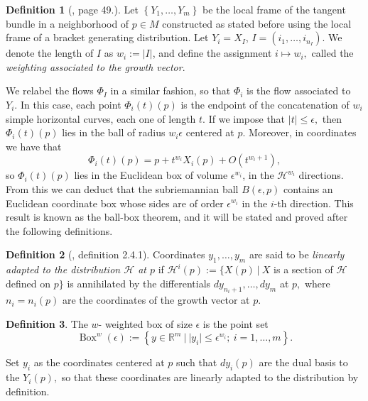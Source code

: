 \documentclass[12pt, letterpaper, reqno]{amsart}
\theoremstyle{definition}
\newtheorem{df}{Definition}
\theoremstyle{plain}
\theoremstyle{remark}
\begin{document}
\begin{df}[\cite{montgomery2002tour}, page 49.] Let $ \left\{ Y_1,\dots, Y_m \right\} $ be the local frame of the tangent bundle in a neighborhood of $ p\in M $ constructed as stated before using the local frame of a bracket generating distribution. Let $ Y_i=X_I $, $ I=(i_1,\dots,i_{n_I}) $. We denote the length of $ I $ as $ w_i:= \left| I \right| $, and define the assignment $ i\mapsto w_i, $ called the \textit{weighting associated to the growth vector}. 
	
\end{df}

We relabel the flows $ \Phi_I $ in a similar fashion, so that $ \Phi_i $ is the flow associated to $ Y_i. $ In this case, each point $ \Phi_i(t)(p) $ is the endpoint of the concatenation of $ w_i $ simple horizontal curves, each one of length $ t $. If we impose that $ \left| t \right|\leq \epsilon, $ then $ \Phi_i(t)(p) $ lies in the ball of radius $ w_i\epsilon $ centered at $ p. $ Moreover, in coordinates we have that 
$$ \Phi_i(t)(p)=p+t^{w_i}X_i(p)+ O(t^{w_i+1}), $$ 
so $ \Phi_i(t)(p) $ lies in the Euclidean box of volume $ \epsilon^{w_i} $, in the $ \mathcal{H}^{w_i} $ directions. From this we can deduct that the subriemannian ball $ B(\epsilon,p) $ contains an Euclidean coordinate box whose sides are of order $ \epsilon^{w_i} $ in the $ i $-th direction. This result is known as the ball-box theorem, and it will be stated and proved after the following definitions.

\begin{df}[\cite{montgomery2002tour}, definition 2.4.1] 
	Coordinates $ y_1,\dots,y_m $ are said to be \textit{linearly adapted to the distribution $\mathcal{H}$ at $ p $ } if $ \mathcal{H}^i(p):= \{ X(p) \ | \ X$ is a section of $\mathcal{H}$ defined on $p$$\}$ is annihilated by the differentials $ dy_{n_i+1},\dots, dy_m $ at $ p, $ where $ n_i=n_i(p) $ are the coordinates of the growth vector at $ p. $  
\end{df}
\begin{df}
	The $ w $- weighted box of size $ \epsilon $ is the point set
	$$ \operatorname{Box}^w(\epsilon) := \left\{ y\in \mathbb{R}^m \ | \ |y_i|\leq \epsilon^{w_i}; \ i=1,\dots,m \right\}.  $$ 
\end{df}

Set $ y_i $ as the coordinates centered at $ p $ such that $ dy_i(p) $ are the dual basis to the $ Y_i(p), $ so that these coordinates are linearly adapted to the distribution by definition.
\end{document}
